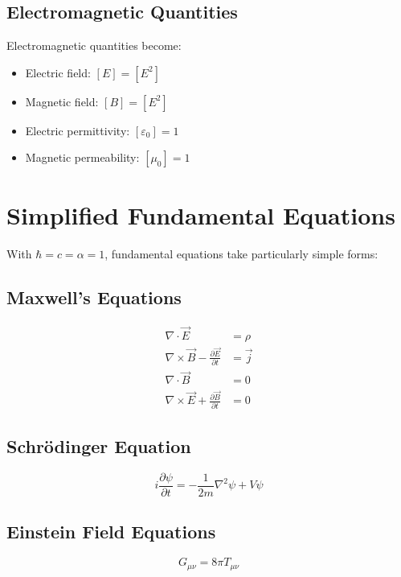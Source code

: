 \documentclass{article}
\begin{document}
	\subsection{Electromagnetic Quantities}
	
	Electromagnetic quantities become:
	
	\begin{itemize}
		\item Electric field: $[E] = [E^2]$ 
		\item Magnetic field: $[B] = [E^2]$
		\item Electric permittivity: $[\varepsilon_0] = 1$ 
		\item Magnetic permeability: $[\mu_0] = 1$
	\end{itemize}
	
	\section{Simplified Fundamental Equations}
	
	With $\hbar = c = \alpha = 1$, fundamental equations take particularly simple forms:
	
	\subsection{Maxwell's Equations}
	\begin{align}
		\nabla \cdot \vec{E} &= \rho \\
		\nabla \times \vec{B} - \frac{\partial \vec{E}}{\partial t} &= \vec{j} \\
		\nabla \cdot \vec{B} &= 0 \\
		\nabla \times \vec{E} + \frac{\partial \vec{B}}{\partial t} &= 0
	\end{align}
	
	\subsection{Schrödinger Equation}
	\begin{equation}
		i\frac{\partial \psi}{\partial t} = -\frac{1}{2m}\nabla^2\psi + V\psi
	\end{equation}
	
	\subsection{Einstein Field Equations}
	\begin{equation}
		G_{\mu\nu} = 8\pi T_{\mu\nu}
	\end{equation}
	
\end{document}
